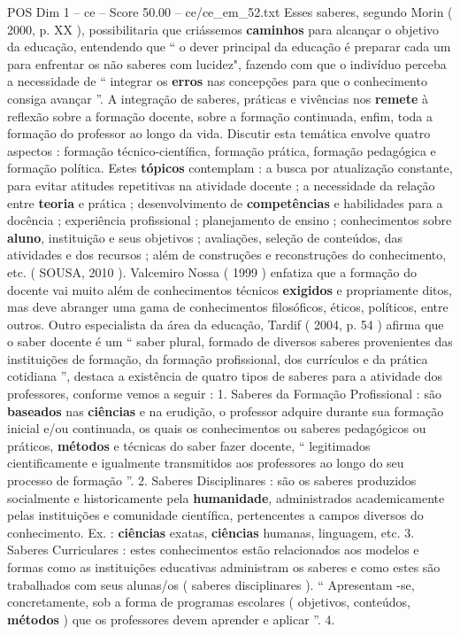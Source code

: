 \begin{textsample}{POS Dim 1 – ce – Score 50.00 – ce/ce\_em\_52.txt}
Esses saberes, segundo Morin ( 2000, p.
XX ), possibilitaria que criássemos \textbf{caminhos} para alcançar o objetivo da educação, entendendo que “ o dever principal da educação é preparar cada um para enfrentar os não saberes com lucidez", fazendo com que o indivíduo perceba a necessidade de “ integrar os \textbf{erros} nas concepções para que o conhecimento consiga avançar ”.
A integração de saberes, práticas e vivências nos \textbf{remete} à reflexão sobre a formação docente, sobre a formação continuada, enfim, toda a formação do professor ao longo da vida.
Discutir esta temática envolve quatro aspectos : formação técnico-científica, formação prática, formação pedagógica e formação política.
Estes \textbf{tópicos} contemplam : a busca por atualização constante, para evitar atitudes repetitivas na atividade docente ; a necessidade da relação entre \textbf{teoria} e prática ; desenvolvimento de \textbf{competências} e habilidades para a docência ; experiência profissional ; planejamento de ensino ; conhecimentos sobre \textbf{aluno}, instituição e seus objetivos ; avaliações, seleção de conteúdos, das atividades e dos recursos ; além de construções e reconstruções do conhecimento, etc. ( SOUSA, 2010 ).
Valcemiro Nossa ( 1999 ) enfatiza que a formação do docente vai muito além de conhecimentos técnicos \textbf{exigidos} e propriamente ditos, mas deve abranger uma gama de conhecimentos filosóficos, éticos, políticos, entre outros.
Outro especialista da área da educação, Tardif ( 2004, p. 54 ) afirma que o saber docente é um “ saber plural, formado de diversos saberes provenientes das instituições de formação, da formação profissional, dos currículos e da prática cotidiana ”, destaca a existência de quatro tipos de saberes para a atividade dos professores, conforme vemos a seguir : 1.
Saberes da Formação Profissional : são \textbf{baseados} nas \textbf{ciências} e na erudição, o professor adquire durante sua formação inicial e/ou continuada, os quais os conhecimentos ou saberes pedagógicos ou práticos, \textbf{métodos} e técnicas do saber fazer docente, “ legitimados cientificamente e igualmente transmitidos aos professores ao longo do seu processo de formação ”. 2.
Saberes Disciplinares : são os saberes produzidos socialmente e historicamente pela \textbf{humanidade}, administrados academicamente pelas instituições e comunidade científica, pertencentes a campos diversos do conhecimento.
Ex. : \textbf{ciências} exatas, \textbf{ciências} humanas, linguagem, etc. 3.
Saberes Curriculares : estes conhecimentos estão relacionados aos modelos e formas como as instituições educativas administram os saberes e como estes são trabalhados com seus alunas/os ( saberes disciplinares ). “ Apresentam -se, concretamente, sob a forma de programas escolares ( objetivos, conteúdos, \textbf{métodos} ) que os professores devem aprender e aplicar ”. 4.

\end{textsample}
